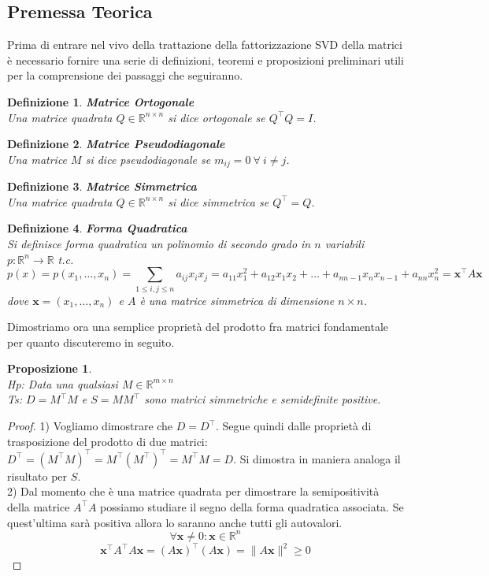 \documentclass[11pt]{article}
\newtheorem{proposition}{Proposizione}
\newtheorem{definition}{Definizione}
\newcommand{\R}{\mathbb{R}}
\begin{document}
\subsection{Premessa Teorica}
Prima di entrare nel vivo della trattazione della fattorizzazione SVD della matrici è necessario fornire una serie di definizioni, teoremi e proposizioni preliminari utili per la comprensione dei passaggi che seguiranno.
\begin{definition}
    \textbf{Matrice Ortogonale}\\ Una matrice quadrata $Q\in\mathbb{R}^{n \times n}$ si dice ortogonale se $Q^\top      Q=I$.
\end{definition}
\begin{definition}
	\textbf{Matrice Pseudodiagonale}\\ Una matrice $M$ si dice pseudodiagonale se $m_{ij}=0 \ \forall \ i\neq j$.
\end{definition}
\begin{definition}
    \textbf{Matrice Simmetrica}\\ Una matrice quadrata $Q\in\mathbb{R}^{n \times n}$ si dice simmetrica se $Q^\top      =Q$.
\end{definition}
\begin{definition}
    \textbf{Forma Quadratica}\\ Si definisce forma quadratica un polinomio di secondo grado in $n$ variabili $p: \mathbb{R}^n \rightarrow \mathbb{R}$ t.c.
    \[
    p(x)=p(x_1,\dots,x_n)=\sum_{1 \leq i,j \leq n}a_{ij}x_ix_j=a_{11}x_1^2+a_{12}x_1x_2 + \dots + a_{nn-1}x_nx_{n-1}+a_{nn}x_n^2=\mathbf{x}^\top      A\mathbf{x}
    \]
    dove $\mathbf{x} = (x_1, \dots, x_n)$ e $A$ è una matrice simmetrica di dimensione $n \times n$.
\end{definition} \noindent
Dimostriamo ora una semplice proprietà del prodotto fra matrici fondamentale per quanto  discuteremo in seguito. 
\begin{proposition}\label{prop 1}
\textbf{}\\
\textit{Hp:} Data una qualsiasi $M\in\mathbb{R}^{m \times n}$\\
\textit{Ts:} $D=M^\top      M$ e $S=MM^\top      $ sono  matrici simmetriche e semidefinite positive.
\end{proposition}
\begin{proof}
1) Vogliamo dimostrare che $D=D^\top      $. Segue quindi dalle proprietà di trasposizione del prodotto di due matrici: $D^\top      =(M^\top      M)^\top      =M^\top  (M^\top)^\top =M^\top M   =D$. Si dimostra in maniera analoga il risultato per $S$.\\
2) Dal momento che è una matrice quadrata per dimostrare la semipositività della matrice $A^\top      A$  possiamo studiare il segno della forma quadratica associata. Se quest'ultima sarà positiva allora lo saranno anche tutti gli autovalori.\\
$$ \forall \mathbf{x}\neq 0: \mathbf{x} \in \R^n$$ $$\mathbf{x}^\top      A^\top      A\mathbf{x}=(A\mathbf{x})^\top      (A\mathbf{x})= \|A\mathbf{x}\|^2\geq 0$$
\end{proof}
\end{document}
